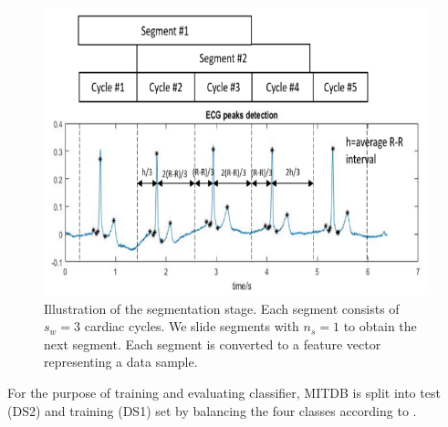 \begin{figure}[t]
	\centering
	\includegraphics[scale=.8]{Fig/segment.png}
	\caption{Illustration of the segmentation stage. Each segment consists of $s_w=3$ cardiac cycles. We slide segments with $n_s=1$ to obtain the next segment. Each segment is converted to a feature vector representing a data sample.}
	\label{fig:interval}
\end{figure}


For the purpose of training and evaluating classifier, MITDB is split into test (DS2) and training (DS1) set by balancing the four classes according to \cite{autofs}.



